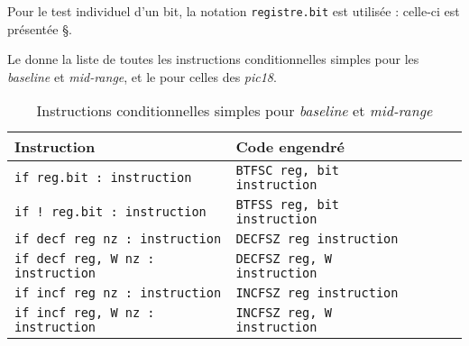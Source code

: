 Pour le test individuel d'un bit, la notation \texttt{registre.bit} est utilisée : celle-ci est présentée §.

Le  donne la liste de toutes les instructions conditionnelles simples pour les \emph{baseline} et \emph{mid-range}, et le  pour celles des \emph{pic18}.

\begin{table}[!ht]
  \centering
  \small
  \begin{tabular}{lp{4cm}lll}
    \textbf{Instruction} & \textbf{Code engendré}\\
    \hline
    \texttt{if reg.bit : instruction} & \texttt{BTFSC reg, bit instruction} \\
    \texttt{if ! reg.bit : instruction} & \texttt{BTFSS reg, bit instruction} \\
    \texttt{if decf reg nz : instruction} & \texttt{DECFSZ reg instruction} \\
    \texttt{if decf reg, W nz : instruction} & \texttt{DECFSZ reg, W instruction} \\
    \texttt{if incf reg nz : instruction} & \texttt{INCFSZ reg instruction} \\
    \texttt{if incf reg, W nz : instruction} & \texttt{INCFSZ reg, W instruction} \\
    \hline
  \end{tabular}
  \caption{Instructions conditionnelles simples pour \emph{baseline} et \emph{mid-range}}
\end{table}

